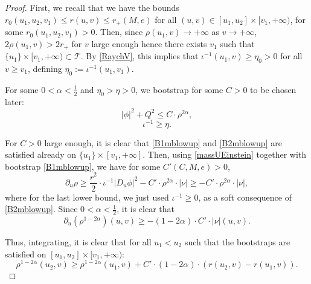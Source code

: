 \documentclass[10pt,a4paper]{article}
\theoremstyle{plain}
\theoremstyle{remark}
\newcommand{\T}{\mathcal{T}}
\theoremstyle{definition}
\theoremstyle{plain}
\theoremstyle{remark}
\theoremstyle{definition}
\newcommand{\CH}{\mathcal{CH}_{i^+}}
\numberwithin{equation}{section}
\begin{document}
\begin{proof} %
	
	First, we recall that we have the bounds $r_0(u_1,u_2,v_1) \leq r(u,v) \leq r_+(M,e)$ for all $(u,v) \in [u_1,u_2] \times [v_1,+\infty)$, for some $r_0(u_1,u_2,v_1)>0$. %
	Then, since $\rho(u_1,v) \rightarrow +\infty$ as $v \rightarrow +\infty$, $2\rho(u_1,v)> 2r_+$ for $v$ large enough hence there exists $v_1$ such that $\{u_1\} \times [v_1,+\infty) \subset \T$. By \eqref{RaychV}, this implies that $\iota^{-1}(u_1,v) \geq \eta_0>0$ for all $v\geq v_1$, defining $\eta_0:=\iota^{-1}(u_1,v_1)$.
	
	
	
	For some $0<\alpha<\frac{1}{2}$ and $\eta_0>\eta>0$, we bootstrap for some $C>0$ to be chosen later: \begin{equation} \label{B1mblowup}
	|\phi|^2+ Q^2 \leq C \cdot \rho^{2\alpha},
	\end{equation} 
	\begin{equation} \label{B2mblowup}
	\iota^{-1}  \geq \eta.
	\end{equation}
	
	For $C>0$ large enough, it is clear that  \eqref{B1mblowup}  and \eqref{B2mblowup} are satisfied already on $\{u_1\} \times [v_1,+\infty]$. Then, using \eqref{massUEinstein} together with bootstrap \eqref{B1mblowup}, we have for some $C'(C,M,e)>0$, 
	$$ \partial_u \rho \geq \frac{r^2}{2} \cdot \iota^{-1} |D_u \phi|^2 -C' \cdot \rho^{2\alpha} \cdot |\nu|  \geq  -C' \cdot \rho^{2\alpha}  \cdot |\nu|,$$ where for the last lower bound, we just used $\iota^{-1} \geq0$, as a soft consequence of \eqref{B2mblowup}. Since $0<\alpha<\frac{1}{2}$, it is clear that $$ \partial_u( \rho^{1-2\alpha})(u,v) \geq -(1-2\alpha) \cdot C' \cdot |\nu|(u,v).$$
	
	Thus, integrating, it is clear  that for all $u_1<u_2$ such that the bootstraps are satisfied on $[u_1,u_2] \times [v_1,+\infty)$: $$ \rho^{1-2\alpha}(u_2,v) \geq  \rho^{1-2\alpha}(u_1,v)+C'  \cdot (1-2\alpha)\cdot (r(u_2,v)-r(u_1,v)).$$
	

\end{proof}
\end{document}
